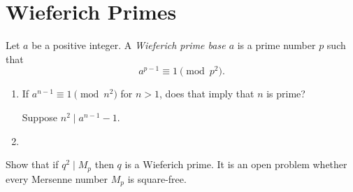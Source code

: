 \chapter{Wieferich Primes}

\begin{definition}
  Let $a$ be a positive integer. A \emph{Wieferich prime base $a$} is a prime number $p$ such that
  \begin{equation*}
    a^{p-1}\equiv 1\pmod{p^2}.
  \end{equation*}
\end{definition}

\begin{enumerate}
\item If $a^{n-1}\equiv 1\pmod{n^2}$ for $n>1$, does that imply that $n$ is prime?

  Suppose $n^2\mid a^{n-1}-1$.
\item
\end{enumerate}

\begin{challenge}
  \exercise Show that if $q^2\mid M_p$ then $q$ is a Wieferich prime. It is an open problem whether every Mersenne number $M_p$ is square-free.
\end{challenge}

